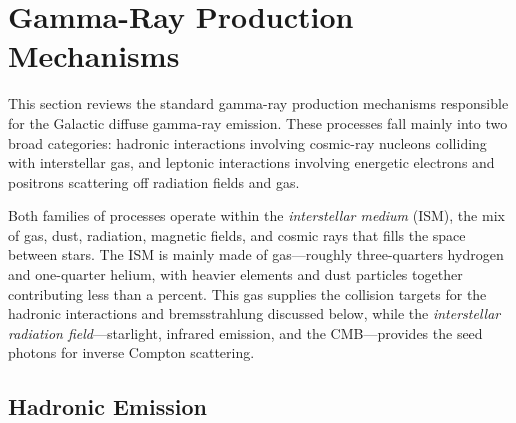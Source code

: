 
\section{Gamma-Ray Production Mechanisms}
\label{sec:production_mechanisms}


This section reviews the standard gamma-ray production mechanisms responsible for the Galactic diffuse gamma-ray emission.
These processes fall mainly into two broad categories: hadronic interactions involving cosmic-ray nucleons colliding with interstellar gas, and leptonic interactions involving energetic electrons and positrons scattering off radiation fields and gas.

Both families of processes operate within the \emph{interstellar medium} (ISM), the mix of gas, dust, radiation, magnetic fields, and cosmic rays that fills the space between stars.
The ISM is mainly made of gas---roughly three-quarters hydrogen and one-quarter helium, with heavier elements and dust particles together contributing less than a percent.
This gas supplies the collision targets for the hadronic interactions and bremsstrahlung discussed below, while the \emph{interstellar radiation field}---starlight, infrared emission, and the CMB---provides the seed photons for inverse Compton scattering.

\subsection{Hadronic Emission}
\label{sec:hadronic}

